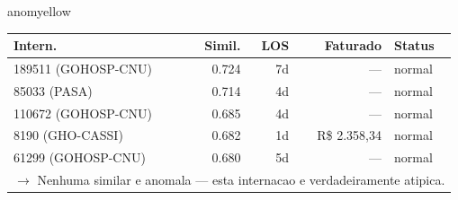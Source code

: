 \documentclass[a4paper,10pt]{article}
\begin{document}
\begin{anomalycard}[Internacao 5402 | GHO-PETROBRAS | MODERADO (z=2.29)]{anomyellow}
\begin{tabular}{l r r r l}\toprule\textbf{Intern.} & \textbf{Simil.} & \textbf{LOS} & \textbf{Faturado} & \textbf{Status} \\\midrule
189511 (GOHOSP-CNU) & 0.724 & 7d & --- & \textcolor{jcubeblue}{normal} \\
85033 (PASA) & 0.714 & 4d & --- & \textcolor{jcubeblue}{normal} \\
110672 (GOHOSP-CNU) & 0.685 & 4d & --- & \textcolor{jcubeblue}{normal} \\
8190 (GHO-CASSI) & 0.682 & 1d & R\$ 2.358,34 & \textcolor{jcubeblue}{normal} \\
61299 (GOHOSP-CNU) & 0.680 & 5d & --- & \textcolor{jcubeblue}{normal} \\
\multicolumn{5}{l}{\textcolor{jcubeblue}{\small $\rightarrow$ Nenhuma similar e anomala --- esta internacao e verdadeiramente atipica.}} \\
\bottomrule\end{tabular}


\end{anomalycard}

\newpage
\end{document}
